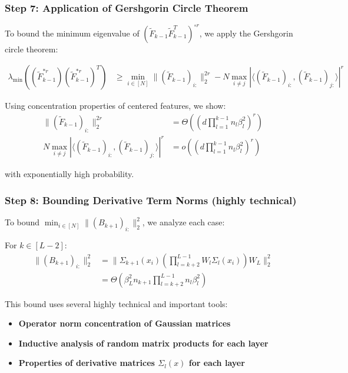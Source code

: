 \documentclass{article}
\newcommand{\evmin}[1]{\lambda_{\min}\left(#1\right)}
\begin{document}
\subsubsection{Step 7: Application of Gershgorin Circle Theorem}

To bound the minimum eigenvalue of $(\tilde{F}_{k-1}\tilde{F}_{k-1}^T)^{\circ r}$, we apply the Gershgorin circle theorem:

\begin{align}
\evmin{(\tilde{F}_{k-1}^{*r})(\tilde{F}_{k-1}^{*r})^T} &\geq \min_{i \in [N]} \|(\tilde{F}_{k-1})_{i:}\|_2^{2r} - N \max_{i \neq j} |\langle (\tilde{F}_{k-1})_{i:}, (\tilde{F}_{k-1})_{j:} \rangle|^r
\end{align}

Using concentration properties of centered features, we show:
\begin{align}
\|(\tilde{F}_{k-1})_{i:}\|_2^{2r} &= \Theta\left(\left(d \prod_{l=1}^{k-1} n_l \beta_l^2\right)^r\right) \\
N \max_{i \neq j} |\langle (\tilde{F}_{k-1})_{i:}, (\tilde{F}_{k-1})_{j:} \rangle|^r &= o\left(\left(d \prod_{l=1}^{k-1} n_l \beta_l^2\right)^r\right)
\end{align}

with exponentially high probability.

\subsubsection{Step 8: Bounding Derivative Term Norms (highly technical)}

To bound $\min_{i \in [N]} \|(B_{k+1})_{i:}\|_2^2$, we analyze each case:

For $k \in [L-2]$:
\begin{align}
\|(B_{k+1})_{i:}\|_2^2 &= \|\Sigma_{k+1}(x_i) \left(\prod_{l=k+2}^{L-1} W_l \Sigma_l(x_i)\right) W_L\|_2^2 \\
&= \Theta\left(\beta_L^2 n_{k+1} \prod_{l=k+2}^{L-1} n_l \beta_l^2\right)
\end{align}

This bound uses several highly technical and important tools:
\begin{itemize}
    \item \textbf{Operator norm concentration of Gaussian matrices}
    \item \textbf{Inductive analysis of random matrix products for each layer}
    \item \textbf{Properties of derivative matrices $\Sigma_l(x)$ for each layer}
\end{itemize}
\end{document}

